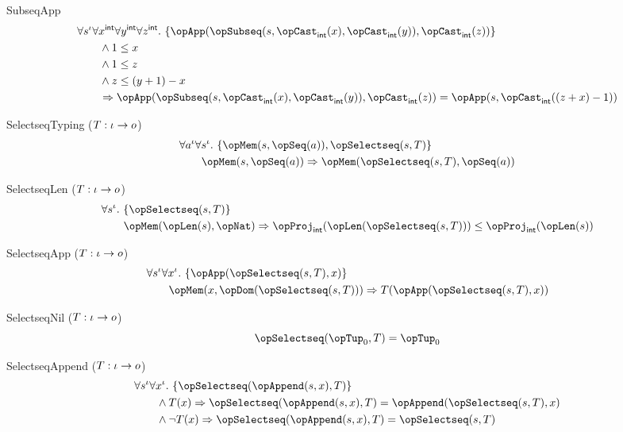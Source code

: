 \documentclass[11pt, a4paper, oneside]{article}
\begin{document}
\begin{axioms}
\item[SubseqApp] \[
        \begin{aligned}
            &\forall s^\idv \forall x^\int \forall y^\int \forall z^\int.\, \st{ \opApp(\opSubseq(s, \opCast_\int(x), \opCast_\int(y)), \opCast_\int(z)) } \\
            &\qquad \wedge 1 \le x \\
            &\qquad \wedge 1 \le z \\
            &\qquad \wedge z \le (y + 1) - x \\
            &\qquad \imp \opApp(\opSubseq(s, \opCast_\int(x), \opCast_\int(y)), \opCast_\int(z)) = \opApp(s, \opCast_\int((z + x) - 1))
        \end{aligned}
    \]

\item[SelectseqTyping ($T : \iota \rightarrow o$)] \[
        \begin{aligned}
            &\forall a^\idv \forall s^\idv.\, \st{ \opMem(s, \opSeq(a)), \opSelectseq(s, T) } \\
            &\qquad \opMem(s, \opSeq(a)) \imp \opMem(\opSelectseq(s, T), \opSeq(a))
        \end{aligned}
    \]

\item[SelectseqLen ($T : \iota \rightarrow o$)] \[
        \begin{aligned}
            &\forall s^\idv.\, \st{ \opSelectseq(s, T) } \\
            &\qquad \opMem(\opLen(s), \opNat) \imp \opProj_\int(\opLen(\opSelectseq(s, T))) \le \opProj_\int(\opLen(s))
        \end{aligned}
    \]

\item[SelectseqApp ($T : \iota \rightarrow o$)] \[
        \begin{aligned}
            &\forall s^\idv \forall x^\idv.\, \st{ \opApp(\opSelectseq(s, T), x) } \\
            &\qquad \opMem(x, \opDom(\opSelectseq(s, T))) \imp T(\opApp(\opSelectseq(s, T), x))
        \end{aligned}
    \]

\item[SelectseqNil ($T : \iota \rightarrow o$)] \[
        \opSelectseq(\opTup_0, T) = \opTup_0
    \]

\item[SelectseqAppend ($T : \iota \rightarrow o$)] \[
        \begin{aligned}
            &\forall s^\idv \forall x^\idv.\, \st{ \opSelectseq(\opAppend(s, x), T) } \\
            &\qquad \wedge T(x) \imp \opSelectseq(\opAppend(s, x), T) = \opAppend(\opSelectseq(s, T), x) \\
            &\qquad \wedge \neg T(x) \imp \opSelectseq(\opAppend(s, x), T) = \opSelectseq(s, T)
        \end{aligned}
    \]


\end{axioms}
\end{document}
